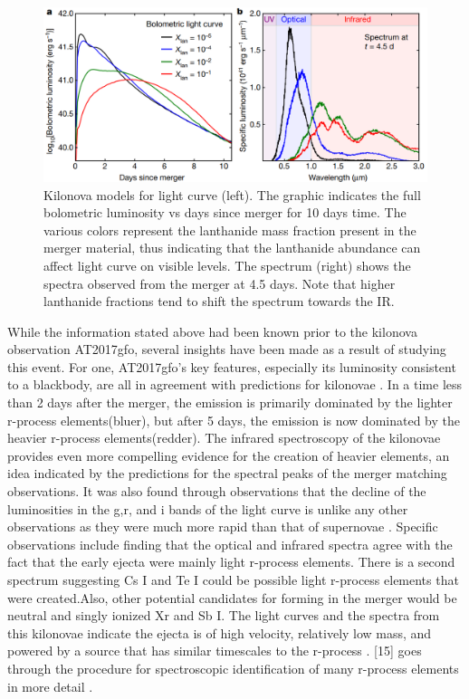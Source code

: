 \documentclass[11pt,a4paper]{article}
\begin{document}
\begin{figure}[h!]
  \includegraphics[width=1\textwidth]{kasen_curves.png}
  \caption{ Kilonova models for light curve \cite{Kasen_Metzger_Barnes_2017} (left). The graphic indicates the full bolometric luminosity vs days since merger for 10 days time. The various colors represent the lanthanide mass fraction present in the merger material, thus indicating that the lanthanide abundance can affect light curve on visible levels. The spectrum \cite{Kasen_Metzger_Barnes_2017} (right) shows the spectra observed from the merger at 4.5 days. Note that higher lanthanide fractions tend to shift the spectrum towards the IR.}
\end{figure}

While the information stated above had been known prior to the kilonova observation  AT2017gfo, several insights have been made as a result of studying this event. For one, AT2017gfo’s key features, especially its luminosity consistent to a blackbody, are all in agreement with predictions for kilonovae \cite{Kasen_Metzger_Barnes_2017}. In a time less than 2 days after the merger, the emission is primarily dominated by the lighter r-process elements(bluer), but after 5 days, the emission is now dominated by the heavier r-process elements(redder). The infrared spectroscopy of the kilonovae provides even more compelling evidence for the creation of heavier elements, an idea indicated by the predictions for the spectral peaks of the merger matching observations. It was also found through observations that the decline of the luminosities in the g,r, and i bands of the light curve is unlike any other observations as they were much more rapid than that of supernovae \cite{Arcavi_2017}. Specific observations include finding that the optical and infrared spectra agree with the fact that the early ejecta were mainly light r-process elements. There is a second spectrum suggesting Cs I and Te I could be possible light r-process elements that were created.Also, other potential candidates for forming in the merger would be neutral and singly ionized Xr and Sb I. The light curves and the spectra from this kilonovae indicate the ejecta is of high velocity, relatively low mass, and powered by a source that has similar timescales to the r-process \cite{Smartt_2017} . [15] goes through the procedure for spectroscopic identification of many r-process elements in more detail \cite{Pian_2017} .
\end{document}
